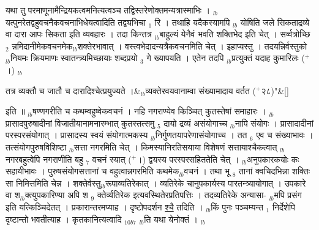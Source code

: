 \documentclass[article,12pt,a4paper]{memoir}%
\newcommand{\add}[1]{($^{+}$#1)}
\begin{document}
	  
	  \pstart \leavevmode%
	यथा तु परमाणूनामैन्द्रियकत्वमनित्यत्वञ्च तद्विस्तरेणोक्तमन्यत्रास्माभिः । {\tiny $_{lb}$}यत्पुनरेतद्वहुवचनैकवचनाभिधेयत्वादिति तद्व्यभिचा {\tiny $_{1}$} रि । तथाहि यदैकस्यामपि {\tiny $_{lb}$} \leavevmode{} योषिति जले सिकताद्रव्ये वा दारा आपः सिकता इति व्यवहारः । तदा किन्तत्र {\tiny $_{lb}$}बाहुल्यं येनैवं भवति शक्तिभेद इति चेत् । सर्व्वत्रोच्छि {\tiny $_{2}$} न्नमिदानीमेकवचनमेक{\tiny $_{lb}$}शक्तेरभावात् । वस्त्वभेदादन्यत्रैकवचनमिति चेत् । इहाप्यस्तु । तदयन्निर्वस्तुको {\tiny $_{lb}$}नियमः क्रियमाणः स्वातन्त्र्यमिच्छायाः शब्दप्रयो {\tiny $_{3}$} गे ख्यापयति । एतेन तदपि {\tiny $_{lb}$}प्रत्युक्तं यदाह {\color{DodgerBlue3}कुमारिलः} \add{।} {\tiny $_{lb}$} 
	    \pend%
	  
	    
	    \stanza[\smallbreak]
	  तत्र व्यक्तौ च जातौ च दारादिश्चेत्प्रयुज्यते ।&{\tiny $_{lb}$}व्यक्तेरवयवानाम्वा संख्यामादाय वर्तत \add{२८}{\normalfontlatin\large\qquad{}"}\&[\smallbreak]
	  
	  
	  
	    \pstart  \leavevmode%
	    \hphantom{.}
	  इति ॥ {\tiny $_{lb}$}षण्णगरीति च कथम्वहुष्वेकवचनं । नहि नगराण्येव किञ्चित् कुतस्तेषां समाहारः । {\tiny $_{lb}$}प्रासादपुरुषादीनां विजातीयानामनारम्भात् कुतस्तत्समु {\tiny $_{5}$} दायो द्रव्यं असंयोगाच्च {\tiny $_{lb}$}नापि संयोगः । प्रासादादीनां परस्परसंयोगात् । प्रासादस्य स्वयं संयोगात्मकस्य {\tiny $_{lb}$}निर्गुणतयापरेणासंयोगाच्च । तत {\tiny $_{6}$} एव च संख्याभावः । तत्संयोगपुरुषविशिष्टा {\tiny $_{lb}$}सत्ता नगरमिति चेत् । किमस्यानिरतिसयाया विशेषणं सत्तायाश्चैकत्वात् {\tiny $_{lb}$}नगरबहुत्वेपि नगराणीति बहु {\tiny $_{7}$} वचनं स्यात् \add{।} द्वयस्य परस्परसहिततेति चेत् । {\tiny $_{lb}$}अनुपकारकयोः कः सहायीभावः । पुरुषसंयोगसत्तानां च वहुत्वान्नगरमिति कथमेक{\tiny $_{lb}$}वचनं । तथा भू {\tiny $_{8}$} तानां क्वचिदभिन्ना शक्तिः सा निमित्तमिति चेन्न । शक्तेर्वस्तु{\tiny $_{lb}$}रूपाव्यतिरेकात् । व्यतिरेके चानुपकार्यस्य पारतन्त्र्यायोगात् । उपकारे वा श{\tiny $_{lb}$}क्त्युपकारिण्या अपि श {\tiny $_{9}$} \leavevmode{} क्तेर्व्यतिरेक इत्यवस्थितेरप्रतिपत्तिः । तदव्यतिरेके अन्यासा- {\tiny $_{lb}$}मपि प्रसंग इति यत्किञ्चिदेतत् । प्रकारान्तरमप्याह । {\color{DodgerBlue3}दृष्टोपदर्शन} \uline{श्चै} तदिति । {\tiny $_{lb}$}किं पुनः पञ्चम्यन्त {\tiny $_{1}$} निर्देशेपि दृष्टान्तो भवतीत्याह । {\color{DodgerBlue3}कृतकानित्यत्वादि {\tiny $_{10b7}$} {\tiny $_{lb}$}ति} यथा येनोक्तं । {\tiny $_{lb}$} 
	    \pend%
	  
\end{document}
